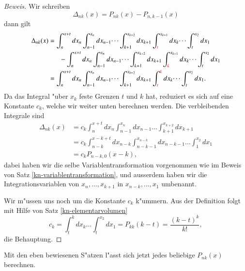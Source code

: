 \begin{proof}[Beweis]
Wir schreiben
\[
\Delta_{nk}(x)= P_{nk}(x)-P_{n,k-1}(x)
\]
dann gilt
\begin{align*}
\Delta_{nk}(x)
&=
\int_n^{x+t}dx_n\int_{n-1}^{x_n}dx_{n-1}\dots\int_{k+1}^{x_{k+2}}dx_{k+1}
\int^{x_{k+1}}_{\color{red}t} dx_k\dots\int_t^{x_2}dx_1
\\
&\phantom{=}\quad-\int_n^{x+t} dx_n\int_{n-1}^{x_n}dx_{n-1}\dots\int_{k+1}^{x_{k+2}}dx_{k+1}
\int^{x_{k+1}}_{\color{red}k} dx_k\dots\int_t^{x_2}dx_1
\\
&=
\int_n^{x+t}dx_n\int_{n-1}^{x_n}dx_{n-1}\dots\int_{k+1}^{x_{k+2}}dx_{k+1}
\int_{{\color{red}t\mathstrut}}^{\color{red}k}dx_k\dots\int_t^{x_2}dx_1.
\end{align*}
Da das Integral "uber $x_k$ feste Grenzen $t$ und $k$ hat, reduziert es
sich auf eine Konstante $c_k$, welche wir weiter unten berechnen werden.
Die verbleibenden Integrale sind
\begin{align*}
\Delta_{nk}(x)
&=
c_k\int_n^{x+t}dx_n\int_{n-1}^{x_n}dx_{n-1}\dots\int_{k+1}^{x_{k+2}}dx_{k+1}
\\
&=
c_k\int_{n-k}^{x-k+t}dx_{n-k}\int_{n-k-1}^{x_{n-k}}dx_{n-k-1}\dots\int_1^{x_2}dx_1
\\
&=c_kP_{n-k,0}(x-k),
\end{align*}
dabei haben wir die selbe Variablentransformation vorgenommen wie im
Beweis von Satz \ref{kn-variablentransformation}, und ausserdem haben
wir die Integrationsvariablen von $x_n,\dots,x_{k+1}$ in $x_{n-k},\dots,x_1$
umbenannt.

Wir m"ussen uns noch um die Konstante $c_k$ k"ummern.
Aus der Definition folgt mit Hilfe von Satz \ref{kn-elementarvolumen}
\begin{equation}
c_k = \int_{t}^{k}dx_k\dots\int_t^{x_2}dx_1=P_{kk}(k-t)=\frac{(k-t)^k}{k!},
\end{equation}
die Behauptung.
\end{proof}
Mit den eben bewiesenen S"atzen l"asst sich jetzt jedes beliebige 
$P_{nk}(x)$ berechnen.

